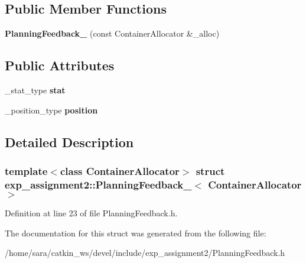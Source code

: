 \subsection*{Public Member Functions}
\begin{DoxyCompactItemize}
\item 
\mbox{\label{structexp__assignment2_1_1PlanningFeedback___aee2dd0cf0296d893b16006cc94b17b64}} 
{\bfseries Planning\+Feedback\+\_\+} (const Container\+Allocator \&\+\_\+alloc)
\end{DoxyCompactItemize}
\subsection*{Public Attributes}
\begin{DoxyCompactItemize}
\item 
\mbox{\label{structexp__assignment2_1_1PlanningFeedback___af414023a9e37d0dce6833285f5c06fc0}} 
\+\_\+stat\+\_\+type {\bfseries stat}
\item 
\mbox{\label{structexp__assignment2_1_1PlanningFeedback___abde8d3d31b426844c56d4b0617caae7b}} 
\+\_\+position\+\_\+type {\bfseries position}
\end{DoxyCompactItemize}


\subsection{Detailed Description}
\subsubsection*{template$<$class Container\+Allocator$>$\newline
struct exp\+\_\+assignment2\+::\+Planning\+Feedback\+\_\+$<$ Container\+Allocator $>$}



Definition at line 23 of file Planning\+Feedback.\+h.



The documentation for this struct was generated from the following file\+:\begin{DoxyCompactItemize}
\item 
/home/sara/catkin\+\_\+ws/devel/include/exp\+\_\+assignment2/Planning\+Feedback.\+h\end{DoxyCompactItemize}
